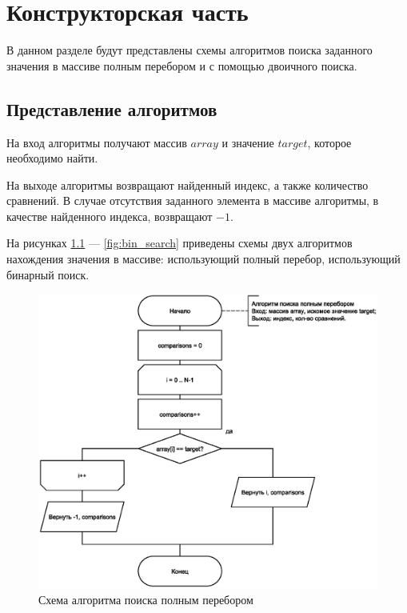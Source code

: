 \chapter{Конструкторская часть}
В данном разделе будут представлены схемы алгоритмов поиска заданного значения в массиве полным перебором и с помощью двоичного поиска.

\section{Представление алгоритмов}

На вход алгоритмы получают массив $array$ и значение $target$, которое необходимо найти.

На выходе алгоритмы возвращают найденный индекс, а также количество сравнений. В случае отсутствия заданного элемента в массиве алгоритмы, в качестве найденного индекса, возвращают $-1$.

На рисунках \ref{fig:classic_search} --- \ref{fig:bin_search} приведены схемы двух алгоритмов нахождения значения в массиве: использующий полный перебор, использующий бинарный поиск.

\clearpage

\begin{figure}[h]
	\centering
	\includegraphics[scale=0.9]{img/fullsearch.eps}
	\caption{Схема алгоритма поиска полным перебором}
	\label{fig:classic_search}
\end{figure}

\clearpage

